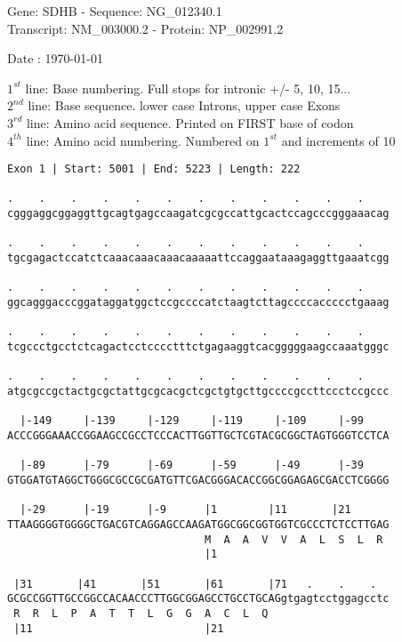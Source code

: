 \documentclass{article}
\begin{document}
\begin{center}
\begin{large}
Gene: SDHB - Sequence: NG\_012340.1\\
Transcript: NM\_003000.2 - Protein: NP\_002991.2
 
 Date : \today
\end{large}
\end{center}
$1^{st}$ line: Base numbering. Full stops for intronic +/- 5, 10, 15...\\
$2^{nd}$ line: Base sequence. lower case Introns, upper case Exons\\
$3^{rd}$ line: Amino acid sequence. Printed on FIRST base of codon\\
$4^{th}$ line: Amino acid numbering. Numbered on $1^{st}$ and increments of 10\\
\begin{Verbatim}
Exon 1 | Start: 5001 | End: 5223 | Length: 222
 
.    .    .    .    .    .    .    .    .    .    .    .    
cgggaggcggaggttgcagtgagccaagatcgcgccattgcactccagcccgggaaacag
  
.    .    .    .    .    .    .    .    .    .    .    .    
tgcgagactccatctcaaacaaacaaacaaaaattccaggaataaagaggttgaaatcgg
  
.    .    .    .    .    .    .    .    .    .    .    .    
ggcagggacccggataggatggctccgccccatctaagtcttagccccaccccctgaaag
  
.    .    .    .    .    .    .    .    .    .    .    .    
tcgccctgcctctcagactcctcccctttctgagaaggtcacgggggaagccaaatgggc
  
.    .    .    .    .    .    .    .    .    .    .    .    
atgcgccgctactgcgctattgcgcacgctcgctgtgcttgccccgccttccctccgccc
  
  |-149     |-139     |-129     |-119     |-109     |-99    
ACCCGGGAAACCGGAAGCCGCCTCCCACTTGGTTGCTCGTACGCGGCTAGTGGGTCCTCA
  
  |-89      |-79      |-69      |-59      |-49      |-39    
GTGGATGTAGGCTGGGCGCCGCGATGTTCGACGGGACACCGGCGGAGAGCGACCTCGGGG
  
  |-29      |-19      |-9      |1        |11       |21      
TTAAGGGGTGGGGCTGACGTCAGGAGCCAAGATGGCGGCGGTGGTCGCCCTCTCCTTGAG
                               M  A  A  V  V  A  L  S  L  R 
                               |1                           
  
 |31       |41       |51       |61       |71   .    .    .  
GCGCCGGTTGCCGGCCACAACCCTTGGCGGAGCCTGCCTGCAGgtgagtcctggagcctc
 R  R  L  P  A  T  T  L  G  G  A  C  L  Q                   
 |11                           |21                          
  

\end{Verbatim}
\end{document}
